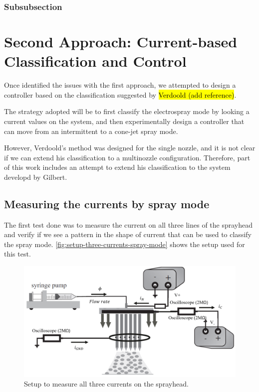 \documentclass[oneside,12pt]{article}
\begin{document}
\subsubsection{Subsubsection}

\blindtext %

\section{Second Approach: Current-based Classification and Control} 

Once identified the issues with the first approach, we attempted to design a 
controller based on the classification suggested by \hl{Verdoold (add reference)}.

The strategy adopted will be to first classify the electrospray mode by looking a current values 
on the system, and then experimentally design a controller that can move from an intermittent
to a cone-jet spray mode.

However, Verdoold's method was designed for the single nozzle, and it is not clear if we can 
extend his classification to a multinozzle configuration. Therefore, part of this work 
includes an attempt to extend his classification to the system developd by 
Gilbert.


\subsection{Measuring the currents by spray mode}

The first test done was to measure the current on all three lines of the sprayhead and 
verify if we see a pattern in the shape of current that can be used to classify the spray mode.
\autoref{fig:setup-three-currents-spray-mode} shows the setup used for this test.

\begin{figure}[h!]
    \centering
    \includegraphics[width=.8\textwidth,trim=1 1 1 1,clip]{figures/setup-three-currents-spray-mode.png}
    \caption{Setup to measure all three currents on the sprayhead.}
    \label{fig:setup-three-currents-spray-mode}
\end{figure}
\end{document}
